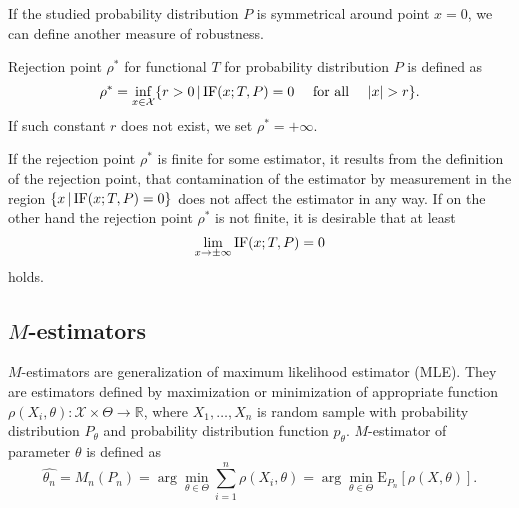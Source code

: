 If the studied probability distribution $P$ is symmetrical around point $x=0$, we can define another measure of robustness.

\begin{definition}
	Rejection point $\rho^*$ for functional $T$ for probability distribution $P$ is defined as 
	\begin{equation}
			\rho^* = \inf_{x \in \mathcal{X}} \lbrace r>0 \, | \, \mathrm{IF}({x};T,P) = 0 \quad \text{ for all }\quad |x| > r\rbrace.
	\end{equation}
	If such constant $r$  does not exist, we set $\rho^* = + \infty.$ 
\end{definition}

If the rejection point $\rho^*$ is finite for some estimator, it results from the definition of the rejection point, that contamination of the estimator by measurement in the region  $\lbrace x \, | \, \mathrm{IF}({x};T,P) = 0 \rbrace$ does not affect the estimator in any way. If on the other hand the rejection point $\rho^*$ is not finite, it is desirable that at least
\begin{equation}
	\lim_{x \rightarrow \pm\infty} \mathrm{IF}({x};T,P) = 0
\end{equation}
holds.

\subsection{$M$-estimators}
$M$-estimators are generalization of maximum likelihood estimator (MLE). They are estimators defined by maximization or minimization of appropriate function $\rho(X_i,\theta):\mathcal{X}\times \Theta \rightarrow \mathbb{R}$, where $X_1,\ldots,X_n$ is random sample with probability distribution  $P_\theta$ and probability distribution function $p_\theta$. $M$-estimator of parameter $\theta$ is defined as 
\begin{equation}
	\hat{\theta_n} = M_n(P_n) = \arg \min_{\theta \in \Theta} \sum_{i=1}^n \rho(X_i,\theta) = \arg \min_{\theta \in \Theta} \mathrm{E}_{P_n}\left[ \rho(X,\theta) \right].
	\label{Modhad1}
\end{equation}

